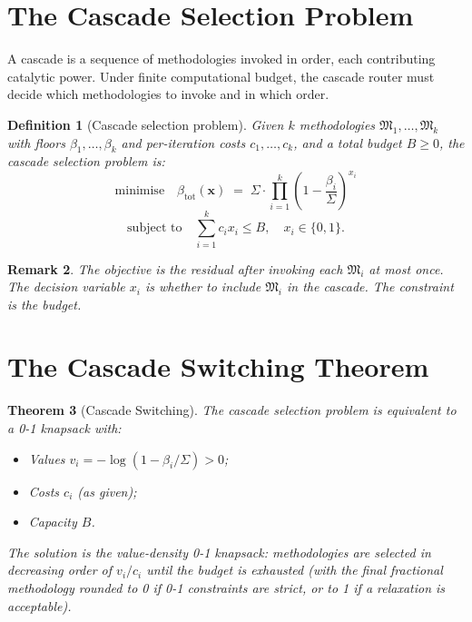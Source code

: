 \documentclass[11pt,a4paper]{article}
\newtheorem{theorem}{Theorem}[section]
\newtheorem{definition}[theorem]{Definition}
\newtheorem{remark}[theorem]{Remark}
\newcommand{\Method}{\mathfrak{M}}
\newcommand{\Sigmax}{\Sigma}
\begin{document}
\section{The Cascade Selection Problem}
\label{sec:cascade-selection}

A cascade is a sequence of methodologies invoked in order, each contributing catalytic power. Under finite computational budget, the cascade router must decide which methodologies to invoke and in which order.

\begin{definition}[Cascade selection problem]
\label{def:cascade-selection}
Given $k$ methodologies $\Method_1, \ldots, \Method_k$ with floors $\beta_1, \ldots, \beta_k$ and per-iteration costs $c_1, \ldots, c_k$, and a total budget $B \geq 0$, the \emph{cascade selection problem} is:
\[
\text{minimise} \quad \beta_{\text{tot}}(\mathbf{x}) \;=\; \Sigmax \cdot \prod_{i=1}^{k} \left(1 - \frac{\beta_i}{\Sigmax}\right)^{x_i}
\]
\[
\text{subject to} \quad \sum_{i=1}^{k} c_i x_i \leq B, \quad x_i \in \{0, 1\}.
\]
\end{definition}

\begin{remark}
The objective is the residual after invoking each $\Method_i$ at most once. The decision variable $x_i$ is whether to include $\Method_i$ in the cascade. The constraint is the budget.
\end{remark}

\section{The Cascade Switching Theorem}
\label{sec:cascade-switching}

\begin{theorem}[Cascade Switching]
\label{thm:cascade-switching}
The cascade selection problem is equivalent to a 0-1 knapsack with:
\begin{itemize}[nosep, leftmargin=*]
\item \emph{Values} $v_i = -\log(1 - \beta_i/\Sigmax) > 0$;
\item \emph{Costs} $c_i$ (as given);
\item \emph{Capacity} $B$.
\end{itemize}
The solution is the value-density 0-1 knapsack: methodologies are selected in decreasing order of $v_i / c_i$ until the budget is exhausted (with the final fractional methodology rounded to 0 if 0-1 constraints are strict, or to 1 if a relaxation is acceptable).
\end{theorem}
\end{document}
